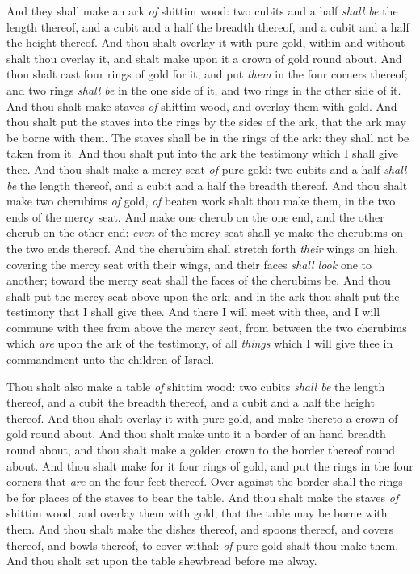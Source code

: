 \documentclass[11pt,letterpaper,oneside]{memoir}
\begin{document}
And they shall make an ark \emph{of} shittim wood: two cubits and a half
\emph{shall be} the length thereof, and a cubit and a half the breadth
thereof, and a cubit and a half the height thereof. And thou shalt
overlay it with pure gold, within and without shalt thou overlay it, and
shalt make upon it a crown of gold round about. And thou shalt cast four
rings of gold for it, and put \emph{them} in the four corners thereof;
and two rings \emph{shall be} in the one side of it, and two rings in
the other side of it. And thou shalt make staves \emph{of} shittim wood,
and overlay them with gold. And thou shalt put the staves into the rings
by the sides of the ark, that the ark may be borne with them. The staves
shall be in the rings of the ark: they shall not be taken from it. And
thou shalt put into the ark the testimony which I shall give thee. And
thou shalt make a mercy seat \emph{of} pure gold: two cubits and a half
\emph{shall be} the length thereof, and a cubit and a half the breadth
thereof. And thou shalt make two cherubims \emph{of} gold, \emph{of}
beaten work shalt thou make them, in the two ends of the mercy seat. And
make one cherub on the one end, and the other cherub on the other end:
\emph{even} of the mercy seat shall ye make the cherubims on the two
ends thereof. And the cherubim shall stretch forth \emph{their} wings on
high, covering the mercy seat with their wings, and their faces \emph{shall
look} one to another; toward the mercy seat shall the faces of the
cherubims be. And thou shalt put the mercy seat above upon the ark; and
in the ark thou shalt put the testimony that I shall give thee. And
there I will meet with thee, and I will commune with thee from above the
mercy seat, from between the two cherubims which \emph{are} upon the ark
of the testimony, of all \emph{things} which I will give thee in
commandment unto the children of Israel.

Thou shalt also make a table \emph{of} shittim wood: two cubits
\emph{shall be} the length thereof, and a cubit the breadth thereof, and
a cubit and a half the height thereof. And thou shalt overlay it with
pure gold, and make thereto a crown of gold round about. And thou shalt
make unto it a border of an hand breadth round about, and thou shalt
make a golden crown to the border thereof round about. And thou shalt
make for it four rings of gold, and put the rings in the four corners
that \emph{are} on the four feet thereof. Over against the border shall
the rings be for places of the staves to bear the table. And thou shalt
make the staves \emph{of} shittim wood, and overlay them with gold, that
the table may be borne with them. And thou shalt make the dishes
thereof, and spoons thereof, and covers thereof, and bowls thereof, to
cover withal: \emph{of} pure gold shalt thou make them. And thou shalt
set upon the table shewbread before me alway.
\end{document}
